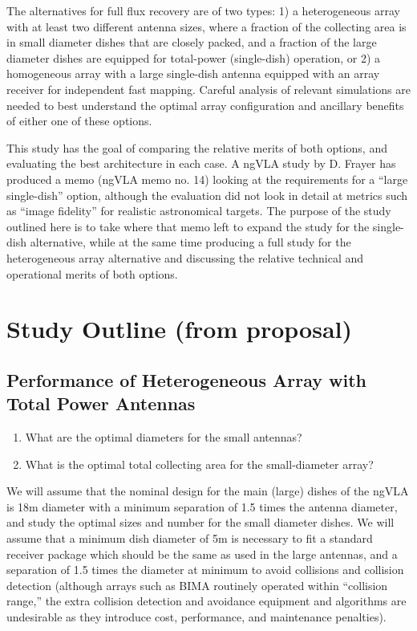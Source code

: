 \documentclass[11pt,twoside]{article}
\begin{document}
The alternatives for full flux recovery are of two types: 1) a
heterogeneous array with at least two different antenna sizes, where a
fraction of the collecting area is in small diameter dishes that are
closely packed, and a fraction of the large diameter dishes are
equipped for total-power (single-dish) operation, or 2) a homogeneous
array with a large single-dish antenna equipped with an array receiver
for independent fast mapping. Careful analysis of relevant simulations
are needed to best understand the optimal array configuration and
ancillary benefits of either one of these options.


This study has the goal of comparing the relative merits of both
options, and evaluating the best architecture in each case. A ngVLA
study by D. Frayer has produced a memo (ngVLA memo no. 14) looking at
the requirements for a ``large single-dish'' option,
although the evaluation did not look in detail at metrics such as
``image fidelity'' for realistic astronomical
targets. The purpose of the study outlined here is to take where that
memo left to expand the study for the single-dish alternative, while
at the same time producing a full study for the heterogeneous array
alternative and discussing the relative technical and operational
merits of both options.


\section{Study Outline (from proposal)}


\subsection{Performance of Heterogeneous Array with Total Power Antennas}

\begin{enumerate}
  
\item What are the optimal diameters for the small antennas?

\item What is the optimal total collecting area for the small-diameter array?
  
\end{enumerate}

We will assume that the nominal design for the main (large) dishes of
the ngVLA is 18m diameter with a minimum separation of 1.5 times the
antenna diameter, and study the optimal sizes and number for the small
diameter dishes. We will assume that a minimum dish diameter of 5m is
necessary to fit a standard receiver package which should be the same
as used in the large antennas, and a separation of 1.5 times the
diameter at minimum to avoid collisions and collision detection
(although arrays such as BIMA routinely operated within
``collision range,'' the extra collision detection and
avoidance equipment and algorithms are undesirable as they introduce
cost, performance, and maintenance penalties).
\end{document}
